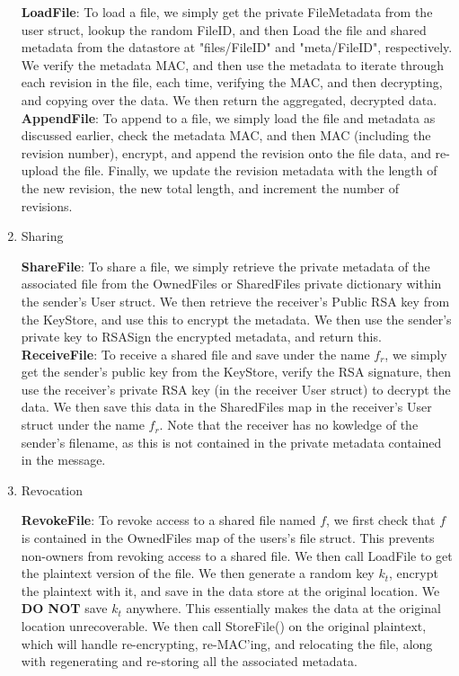 \documentclass[11pt]{article}
\begin{document}
\begin{enumerate}
\textbf{LoadFile}: To load a file, we simply get the private FileMetadata from the user struct, lookup the random FileID, and then Load the file and shared metadata from the datastore at "files/FileID" and "meta/FileID", respectively. We verify the metadata MAC, and then use the metadata to iterate through each revision in the file, each time, verifying the MAC, and then decrypting, and copying over the data. We then return the aggregated, decrypted data. \\

\textbf{AppendFile}: To append to a file, we simply load the file and metadata as discussed earlier, check the metadata MAC, and then MAC (including the revision number), encrypt, and append the revision onto the file data, and re-upload the file. Finally, we update the revision metadata with the length of the new revision, the new total length, and increment the number of revisions.\\

\item{Sharing}

\textbf{ShareFile}: To share  a file, we simply retrieve the private metadata of the associated file from the OwnedFiles or SharedFiles private dictionary within the sender's User struct. We then retrieve the receiver's Public RSA key from the KeyStore, and use this to encrypt the metadata. We then use the sender's private key to RSASign the encrypted metadata, and return this.\\

\textbf{ReceiveFile}: To receive a shared file and save under the name $f_r$, we simply get the sender's public key from the KeyStore, verify the RSA signature, then use the receiver's private RSA key (in the receiver User struct) to decrypt the data. We then save this data in the SharedFiles map in the receiver's User struct under the name $f_r$. Note that the receiver has no kowledge of the sender's filename, as this is not contained in the private metadata contained in the message.\\

\item{Revocation}

\textbf{RevokeFile}: To revoke access to a shared file named $f$, we first check that $f$ is contained in the OwnedFiles map of the users's file struct. This prevents non-owners from revoking access to a shared file. We then call LoadFile to get the plaintext version of the file. We then generate a random key $k_t$, encrypt the plaintext with it, and save in the data store at the original location. We \textbf{DO NOT} save $k_t$ anywhere. This essentially makes the data at the original location unrecoverable. We then call StoreFile() on the original plaintext, which will handle re-encrypting, re-MAC'ing, and relocating the file, along with regenerating and re-storing all the associated metadata.

\end{enumerate}
\end{document}
